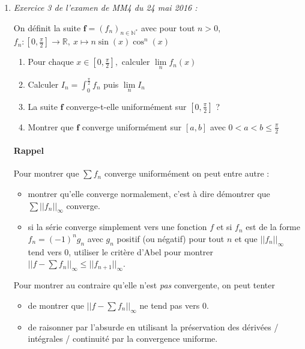 \documentclass[]{article}
\begin{document}
\begin{enumerate}
\item \textit{Exercice 3 de l'examen de MM4 du 24 mai 2016 :}

On définit la suite $\textbf{f}=(f_n)_{n \in \mathbb{N}^*}$ avec pour tout $n > 0$, $f_n : [0, \frac{\pi}{2}] \longrightarrow \mathbb{R}, ~ x \longmapsto n \sin(x) \cos^n(x)$

\begin{enumerate}
	\item Pour chaque $x \in [0, \frac{\pi}{2}],$ calculer $\displaystyle \lim\limits_{n} f_n(x)$
	\item Calculer $\displaystyle I_n=\int_0^{\frac{\pi}{2}}f_n$ puis $\lim\limits_{n} I_n$
	\item La suite $\textbf{f}$ converge-t-elle uniformément sur $[0, \frac{\pi}{2}]$ ?
	\item Montrer que $\textbf{f}$ converge uniformément sur $[a,b]$ avec $0 < a < b \leqslant \frac{\pi}{2}$
\end{enumerate}

\paragraph{Rappel} Pour montrer que $\displaystyle \sum f_n$ converge uniformément on peut entre autre :
\begin{itemize}
	\item montrer qu'elle converge normalement, c'est à dire démontrer que $\displaystyle \sum ||f_n||_{\infty}$ converge.
	
	\item si la série converge simplement vers une fonction $f$ et si $f_n$ est de la forme $f_n=(-1)^n g_n$ avec $g_n$ positif (ou négatif) pour tout $n$ et que $||f_n||_{\infty}$ tend vers 0, utiliser le critère d'Abel pour montrer $\displaystyle \left|\left| f-\sum f_n\right|\right|_{\infty} \leqslant ||f_{n+1}||_{\infty}$.
\end{itemize}

Pour montrer au contraire qu'elle n'est \textit{pas} convergente, on peut tenter
\begin{itemize}
	\item de montrer que $\displaystyle ||f-\sum f_n||_{\infty}$ ne tend pas vers $0$.
	
	\item de raisonner par l'absurde en utilisant la préservation des dérivées / intégrales / continuité par la convergence uniforme.
\end{itemize}


\end{enumerate}
\end{document}
